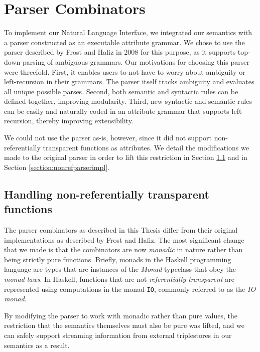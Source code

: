 \documentclass[../main.tex]{subfiles}
\begin{document}
\chapter{Parser Combinators}
\label{chapter:combinators}

To implement our Natural Language Interface, we integrated our semantics with a parser constructed as an executable attribute grammar.  We chose to use the parser
described by Frost and Hafiz in 2008\cite{frosthafiz2008} for this purpose, as it supports top-down parsing of ambiguous grammars.  Our motivations
for choosing this parser were threefold.  First, it enables users to not have to worry about ambiguity or left-recursion in their grammars.  The parser itself
tracks ambiguity and evaluates all unique possible parses\cite{frosthafiz2008}.  Second, both semantic and syntactic rules can be defined together, improving modularity\cite{frosthafiz2008}.
Third, new syntactic and semantic rules can be easily and naturally coded in an attribute grammar that supports left recursion, thereby improving
extensibility\cite{frosthafiz2008}.

We could not use the parser as-is, however, since it did not support non-referentially transparent functions as attributes.  We detail the modifications we made to the original parser in order to lift this restriction in Section \ref{section:nonrefparser} and in Section \ref{section:nonrefparserimpl}.

\section{Handling non-referentially transparent functions}
\label{section:nonrefparser}

The parser combinators as described in this Thesis differ from their original implementations
as described by Frost and Hafiz\cite{frosthafiz2008}.  The most significant change that we made is that the combinators are now {\em monadic} in nature rather than being strictly pure functions.
Briefly, monads in the Haskell programming language are types that are instances of the {\em Monad} typeclass that obey the
{\em monad laws}\cite{monadlaws}.  In Haskell, functions that are not {\em referentially transparent} are represented using computations in the monad \texttt{IO}, commonly referred to as the {\em IO monad}.

By modifying the parser to work with monadic rather than pure values, the restriction that the semantics themselves must also be pure was lifted, and
we can safely support streaming information from external triplestores in our semantics as a result.
\end{document}
